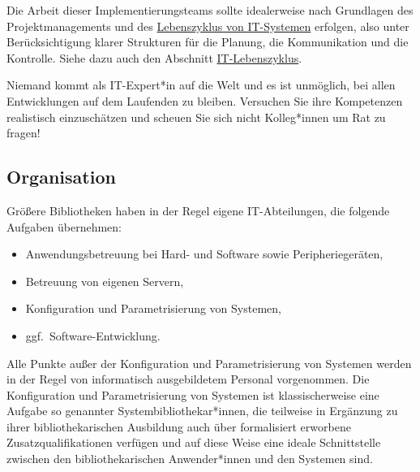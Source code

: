 \documentclass[
  11pt,
  letterpaper,
  DIV=11,
  twoside]{scrreprt}
\begin{document}
Die Arbeit dieser Implementierungsteams sollte idealerweise nach
Grundlagen des Projektmanagements und des
\hyperref[it-lebenszyklus]{Lebenszyklus von IT-Systemen} erfolgen, also
unter Berücksichtigung klarer Strukturen für die Planung, die
Kommunikation und die Kontrolle. Siehe dazu auch den Abschnitt
\hyperref[it-lebenszyklus]{IT-Lebenszyklus}.

\begin{tcolorbox}[enhanced jigsaw, leftrule=.75mm, toprule=.15mm, left=2mm, opacityback=0, arc=.35mm, colback=white, breakable, colframe=quarto-callout-tip-color-frame, rightrule=.15mm, bottomrule=.15mm]
\begin{minipage}[t]{5.5mm}
\textcolor{quarto-callout-tip-color}{\faLightbulb}
\end{minipage}%
\begin{minipage}[t]{\textwidth - 5.5mm}

Niemand kommt als IT-Expert*in auf die Welt und es ist unmöglich, bei
allen Entwicklungen auf dem Laufenden zu bleiben. Versuchen Sie ihre
Kompetenzen realistisch einzuschätzen und scheuen Sie sich nicht
Kolleg*innen um Rat zu fragen!

\end{minipage}%
\end{tcolorbox}

\subsection{Organisation}\label{organisation}

Größere Bibliotheken haben in der Regel eigene IT-Abteilungen, die
folgende Aufgaben übernehmen:

\begin{itemize}
\item
  Anwendungsbetreuung bei Hard- und Software sowie Peripheriegeräten,
\item
  Betreuung von eigenen Servern,
\item
  Konfiguration und Parametrisierung von Systemen,
\item
  ggf.~Software-Entwicklung.
\end{itemize}

Alle Punkte außer der Konfiguration und Parametrisierung von Systemen
werden in der Regel von informatisch ausgebildetem Personal vorgenommen.
Die Konfiguration und Parametrisierung von Systemen ist klassischerweise
eine Aufgabe so genannter Systembibliothekar*innen, die teilweise in
Ergänzung zu ihrer bibliothekarischen Ausbildung auch über formalisiert
erworbene Zusatzqualifikationen verfügen und auf diese Weise eine ideale
Schnittstelle zwischen den bibliothekarischen Anwender*innen und den
Systemen sind.
\end{document}
